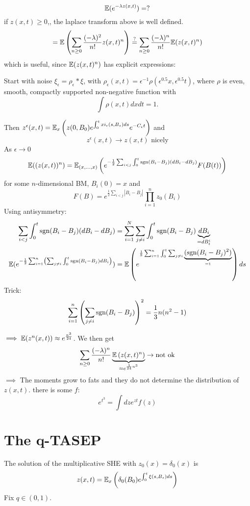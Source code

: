 \[\mathbb{E}(e^{-\lambda z(x,t)})=?\]
if $z(x,t)\geq 0$,, the laplace transform above is well defined.
\[=\mathbb{E}\left(\sum_{n\geq 0}\frac{(-\lambda)^2}{n!}z(x,t)^n\right)\stackrel{?}{=}\sum_{n\geq 0}\frac{(-\lambda)^n}{n!}\mathbb{E}(z(x,t)^n)\]
which is useful, since $\mathbb{E}(z(x,t)^n)$ has explicit expressions:

 Start with noise $\xi_\epsilon=\rho_{\epsilon}*\xi$, with $\rho_\epsilon(x,t)=\epsilon^{-1}\rho(\epsilon^{0.5}x,\epsilon^{0.5}t)$, where $\rho$ is even, smooth, compactly supported non-negative function with
\[\int\rho(x,t)dxdt=1.\]

Then $z^\epsilon(x,t)=\mathbb{E}_x\left(z(0,B_0)e^{\int_0^txi_\epsilon(s,B_s)ds}e^{-C_\epsilon t}\right)$ and 
\[z^\epsilon(x,t)\to z(x,t)\text{ nicely}\]
As $\epsilon\to 0$
\[\mathbb{E}((z(x,t))^n)=\mathbb{E}_{(x,\dots,x)}\left(e^{-\frac{1}{2}\sum_{i<j}\int_0^t\text{sgn}(B_i-B_j)(dB_i-dB_j)}F(B(t))\right)\]
for some $n$-dimensional BM, $B_i(0)=x$ and 
\[F(B)=e^{\frac{1}{2}\sum_{i<j}|B_i-B_j|}\prod_{i=1}^nz_0(B_i)\]
Using antisymmetry:
\begin{align*}
    \sum_{i<j}\int_0^t\text{sgn}(B_i-B_j)(dB_i-dB_j)&=\sum_{i=1}^N\sum_{j\neq i}\int_0^t\text{sgn}(B_i-B_j)\underbrace{dB_i}_{=dB_t^i}\\
    \mathbb{E}(e^{-\frac{1}{2}\sum_{i=1}^n\left(\sum_{j\neq i} \int_0^t \text{sgn}(B_i-B_j)dB_i\right)})&=\mathbb{E}\left(e^{\frac{1}{8}\sum_{i=1}^n\int_0^t\sum_{j\neq i}\underbrace{(\text{sgn}(B_i-B_j)^2)}_{=1}}\right)ds
\end{align*} 
Trick:
\[\sum_{i=1}^n\left(\sum_{j\neq i}\text{sgn}(B_i-B_j)\right)^2=\frac{1}{3}n(n^2-1)\]

$\implies \mathbb{E}(z^n(x,t))\approx e^{\frac{n^3}{24}}$. We then get 
\begin{align*}
    \sum_{n\geq 0}\frac{(-\lambda)^n}{n!}\underbrace{\mathbb{E}\left(z(x,t)^n\right)}_{\approx e^{\frac{1}{24}n^3}}\to \text{not ok}
\end{align*}
$\implies$ The moments grow to fats and they do not determine the distribution of $z(x,t)$.
there is some $f$:
\[e^{t^3}=\int dz e^{zt}f(z)\]

\section{The q-TASEP}

The solution of the multiplicative SHE with $z_0(x)=\delta_0(x)$ is 
\[z(x,t)=\mathbb{E}_x\left(   \delta_0(B_0)e^{\int_0^t \xi(s,B_s)ds}\right)\]
Fix $q\in(0,1)$.


